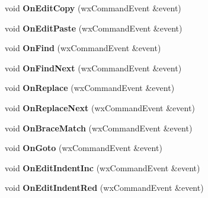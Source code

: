 \begin{DoxyCompactItemize}
\item 
\hypertarget{class_edit_a2478644d3faf1cc46b30519fb47abe35}{void {\bfseries On\+Edit\+Copy} (wx\+Command\+Event \&event)}\label{class_edit_a2478644d3faf1cc46b30519fb47abe35}

\item 
\hypertarget{class_edit_a88d1917bd250026e892b641aa3978241}{void {\bfseries On\+Edit\+Paste} (wx\+Command\+Event \&event)}\label{class_edit_a88d1917bd250026e892b641aa3978241}

\item 
\hypertarget{class_edit_a9342c879dadcc5cc13a8d5a3a33d4487}{void {\bfseries On\+Find} (wx\+Command\+Event \&event)}\label{class_edit_a9342c879dadcc5cc13a8d5a3a33d4487}

\item 
\hypertarget{class_edit_a428a613ac9e6081dc27b1660e28b0cf3}{void {\bfseries On\+Find\+Next} (wx\+Command\+Event \&event)}\label{class_edit_a428a613ac9e6081dc27b1660e28b0cf3}

\item 
\hypertarget{class_edit_ad4eb02f4e36b02050b9220604e95d8cb}{void {\bfseries On\+Replace} (wx\+Command\+Event \&event)}\label{class_edit_ad4eb02f4e36b02050b9220604e95d8cb}

\item 
\hypertarget{class_edit_a014b36331a97d3957c2e4b24cb5c6c46}{void {\bfseries On\+Replace\+Next} (wx\+Command\+Event \&event)}\label{class_edit_a014b36331a97d3957c2e4b24cb5c6c46}

\item 
\hypertarget{class_edit_a9dd0ae369b07ad6be4686c95ce013761}{void {\bfseries On\+Brace\+Match} (wx\+Command\+Event \&event)}\label{class_edit_a9dd0ae369b07ad6be4686c95ce013761}

\item 
\hypertarget{class_edit_a0ab101c0f8abfddd483ef135984020b1}{void {\bfseries On\+Goto} (wx\+Command\+Event \&event)}\label{class_edit_a0ab101c0f8abfddd483ef135984020b1}

\item 
\hypertarget{class_edit_aa006c200e66edd5ae1e4c6af280da613}{void {\bfseries On\+Edit\+Indent\+Inc} (wx\+Command\+Event \&event)}\label{class_edit_aa006c200e66edd5ae1e4c6af280da613}

\item 
\hypertarget{class_edit_a4a1956c8b612a86a76d9c7449bef73d2}{void {\bfseries On\+Edit\+Indent\+Red} (wx\+Command\+Event \&event)}\label{class_edit_a4a1956c8b612a86a76d9c7449bef73d2}


\end{DoxyCompactItemize}
